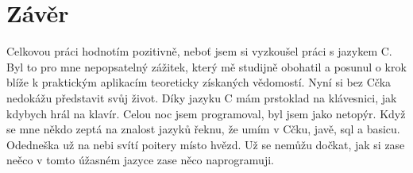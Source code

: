 \documentclass[12pt, a4paper]{article}
\begin{document}
\section{Závěr}
Celkovou práci hodnotím pozitivně, neboť jsem si vyzkoušel práci s jazykem C. Byl to pro mne nepopsatelný zážitek, který mě studijně obohatil a posunul o krok blíže k praktickým aplikacím teoreticky získaných vědomostí. Nyní si bez Cčka nedokážu představit svůj život. Díky jazyku C mám prstoklad na klávesnici, jak kdybych hrál na klavír. Celou noc jsem programoval, byl jsem jako netopýr. Když se mne někdo zeptá na znalost jazyků řeknu, že umím v Cčku, javě, sql a basicu. Odedneška už na nebi svítí poitery místo hvězd. Už se nemůžu dočkat, jak si zase neěco v tomto úžasném jazyce zase něco naprogramuji. 
\end{document}
